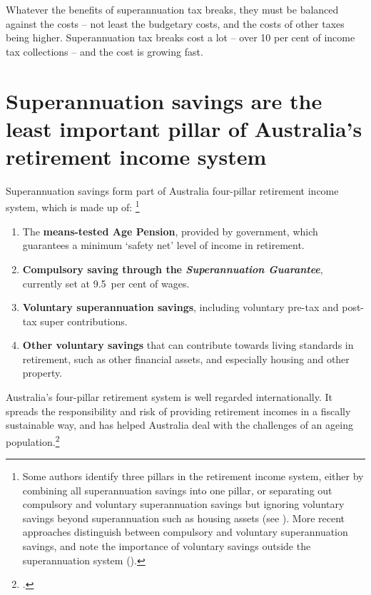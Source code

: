 \documentclass{grattanAlpha}
\begin{document}
Whatever the benefits of superannuation tax breaks, they must be balanced against the costs – not least the budgetary costs, and the costs of other taxes being higher. Superannuation tax breaks cost a lot – over 10 per cent of income tax collections – and the cost is growing fast.

\section{Superannuation savings are the least important pillar of Australia's retirement income system}\label{sec:SUPER-Super-savings-are-least-important-pillar}\label{sec:SUPER-2-1}
Superannuation savings form part of Australia four-pillar retirement income system, which is made up of:%
\footnote{%
Some authors identify three pillars in the retirement income system, either by combining all superannuation savings into one pillar, or separating out compulsory and voluntary superannuation savings but ignoring voluntary savings beyond superannuation such as housing assets (see \textcite[][9]{Treasury2009aftsRetirementIncomeStrategicIssues}). More recent approaches distinguish between compulsory and voluntary superannuation savings, and note the importance of voluntary savings outside the superannuation system (\textcite[][17]{Derby2015}). 
} 

\begin{enumerate}
\item The \textbf{means-tested Age Pension}, provided by government, which guarantees a minimum `safety net' level of income in retirement.
\item \textbf{Compulsory saving through the \emph{Superannuation Guarantee}}, currently set at 9.5~per cent of wages.
\item \textbf{Voluntary superannuation savings}, including voluntary pre-tax and post-tax super contributions.
\item \textbf{Other voluntary savings} that can contribute towards living standards in retirement, such as other financial assets, and especially housing and other property.
\end{enumerate}

Australia’s four-pillar retirement system is well regarded internationally. It spreads the responsibility and risk of providing retirement incomes in a fiscally sustainable way, and has helped Australia deal with the challenges of an ageing population.\footcite{Mercer2015} 
\end{document}

